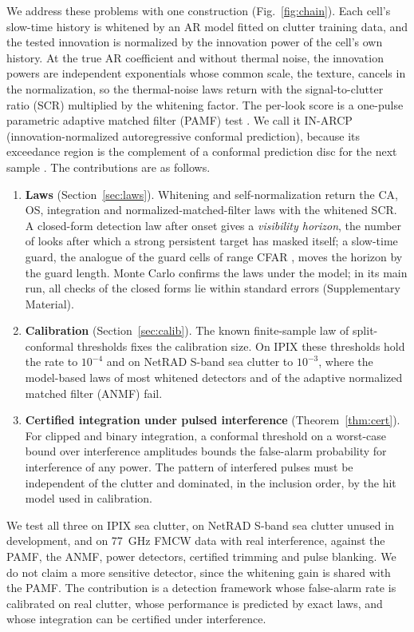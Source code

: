 \documentclass[journal]{IEEEtran}
\begin{document}
We address these problems with one construction (Fig.~\ref{fig:chain}). Each cell's slow-time history is whitened by an AR model fitted on clutter training data, and the tested innovation is normalized by the innovation power of the cell's own history. At the true AR coefficient and without thermal noise, the innovation powers are independent exponentials whose common scale, the texture, cancels in the normalization, so the thermal-noise laws return with the signal-to-clutter ratio (SCR) multiplied by the whitening factor. The per-look score is a one-pulse parametric adaptive matched filter (PAMF) test \cite{roman2000}. We call it IN-ARCP (innovation-normalized autoregressive conformal prediction), because its exceedance region is the complement of a conformal prediction disc for the next sample \cite{lei2018}. The contributions are as follows.
\begin{enumerate}[leftmargin=*,itemsep=2pt]
\item \textbf{Laws} (Section~\ref{sec:laws}). Whitening and self-normalization return the CA, OS, integration and normalized-matched-filter laws with the whitened SCR. A closed-form detection law after onset gives a \emph{visibility horizon}, the number of looks after which a strong persistent target has masked itself; a slow-time guard, the analogue of the guard cells of range CFAR \cite{richards2014}, moves the horizon by the guard length. Monte Carlo confirms the laws under the model; in its main run, all \NLawChecks{} checks of the closed forms lie within \LawChecksZBound{} standard errors (Supplementary Material).
\item \textbf{Calibration} (Section~\ref{sec:calib}). The known finite-sample law of split-conformal thresholds \cite{vovk2012} fixes the calibration size. On IPIX these thresholds hold the rate to $10^{-4}$ and on NetRAD S-band sea clutter to $10^{-3}$, where the model-based laws of most whitened detectors and of the adaptive normalized matched filter (ANMF) fail.
\item \textbf{Certified integration under pulsed interference} (Theorem~\ref{thm:cert}). For clipped \cite{abbasi2018clip} and binary integration, a conformal threshold on a worst-case bound over interference amplitudes bounds the false-alarm probability for interference of any power. The pattern of interfered pulses must be independent of the clutter and dominated, in the inclusion order, by the hit model used in calibration.
\end{enumerate}
We test all three on IPIX sea clutter, on NetRAD S-band sea clutter unused in development, and on 77~GHz FMCW data with real interference, against the PAMF, the ANMF, power detectors, certified trimming and pulse blanking. We do not claim a more sensitive detector, since the whitening gain is shared with the PAMF. The contribution is a detection framework whose false-alarm rate is calibrated on real clutter, whose performance is predicted by exact laws, and whose integration can be certified under interference.
\end{document}
